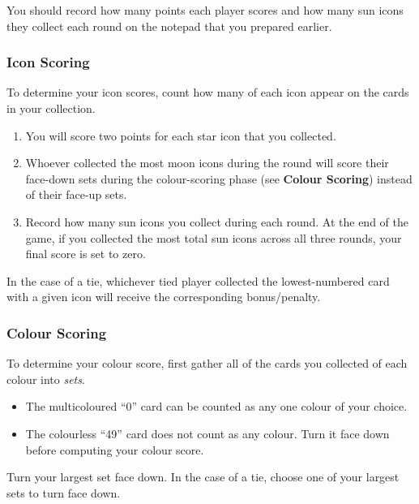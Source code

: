 \documentclass[a6paper, parskip=half, DIV=14, 10pt]{scrartcl}
\begin{document}
You should record how many points each player scores and how many sun icons they collect each round on the notepad that you prepared earlier.


\vfill

\subsubsection*{Icon Scoring}
To determine your icon scores, count how many of each icon appear on the cards in your collection.
\begin{enumerate}[leftmargin=*]
\item You will score two points for each star icon that you collected.
\item Whoever collected the most moon icons during the round will score their face-down sets during the colour-scoring phase (see \textbf{Colour Scoring}) instead of their face-up sets.%
\item Record how many sun icons you collect during each round. At the end of the game, if you collected the most total sun icons across all three rounds, your final score is set to zero.%
\end{enumerate}
In the case of a tie, whichever tied player collected the lowest-numbered card with a given icon will receive the corresponding bonus/penalty.

\newpage

\subsubsection*{Colour Scoring}
To determine your colour score, first gather all of the cards you collected of each colour into \emph{sets}.
\begin{itemize}[leftmargin=*]
\item The multicoloured ``0'' card can be counted as any one colour of your choice.
\item The colourless ``49'' card does not count as any colour. Turn it face down before computing your colour score.
\end{itemize}
Turn your largest set face down.
In the case of a tie, choose one of your largest sets to turn face down.
\end{document}
